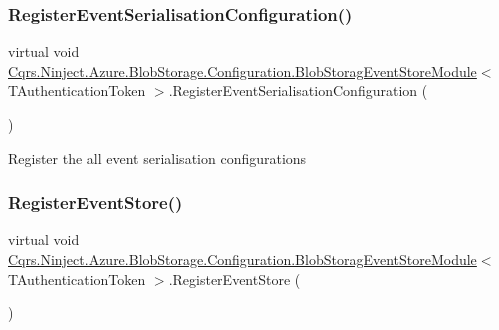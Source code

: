 \subsubsection{\texorpdfstring{Register\+Event\+Serialisation\+Configuration()}{RegisterEventSerialisationConfiguration()}}
{\footnotesize\ttfamily virtual void \hyperlink{classCqrs_1_1Ninject_1_1Azure_1_1BlobStorage_1_1Configuration_1_1BlobStoragEventStoreModule}{Cqrs.\+Ninject.\+Azure.\+Blob\+Storage.\+Configuration.\+Blob\+Storag\+Event\+Store\+Module}$<$ T\+Authentication\+Token $>$.Register\+Event\+Serialisation\+Configuration (\begin{DoxyParamCaption}{ }\end{DoxyParamCaption})\hspace{0.3cm}{\ttfamily [virtual]}}



Register the all event serialisation configurations 

\mbox{\label{classCqrs_1_1Ninject_1_1Azure_1_1BlobStorage_1_1Configuration_1_1BlobStoragEventStoreModule_a579cbe7615e4cf812946ff43e3a5aebd_a579cbe7615e4cf812946ff43e3a5aebd}} 
\subsubsection{\texorpdfstring{Register\+Event\+Store()}{RegisterEventStore()}}
{\footnotesize\ttfamily virtual void \hyperlink{classCqrs_1_1Ninject_1_1Azure_1_1BlobStorage_1_1Configuration_1_1BlobStoragEventStoreModule}{Cqrs.\+Ninject.\+Azure.\+Blob\+Storage.\+Configuration.\+Blob\+Storag\+Event\+Store\+Module}$<$ T\+Authentication\+Token $>$.Register\+Event\+Store (\begin{DoxyParamCaption}{ }\end{DoxyParamCaption})\hspace{0.3cm}{\ttfamily [virtual]}}



